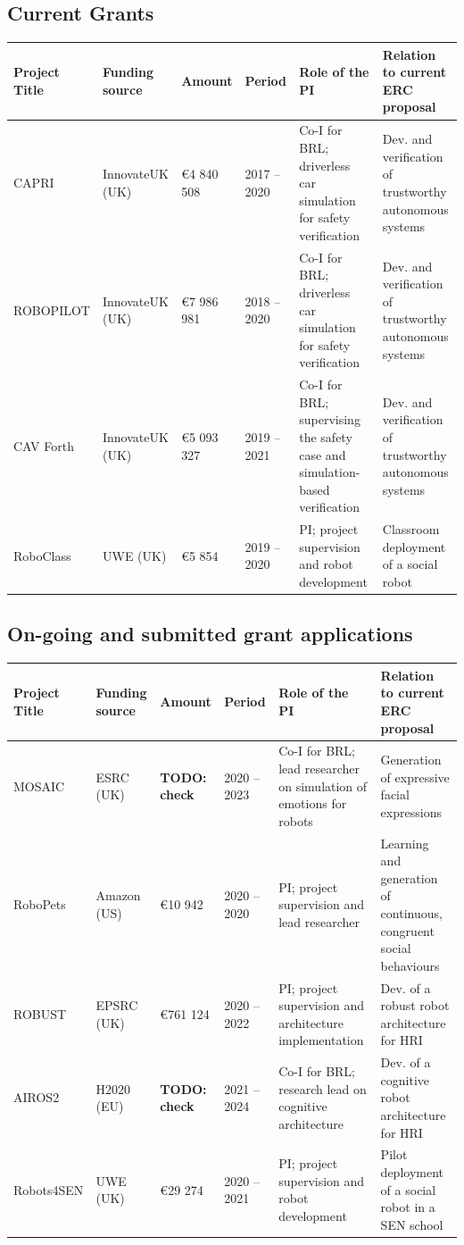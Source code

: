 \documentclass[11pt,a4paper]{report}
\newcommand{\TODO}[1]{{\color{red}\textbf{TODO: #1}}}
\begin{document}
\subsection{Current Grants}

\begin{tabular}{llllp{4cm}p{4cm}}
\toprule
\textbf{Project Title} & \textbf{Funding source} & \textbf{Amount} & \textbf{Period} & \textbf{Role of the PI} & \textbf{Relation to current  ERC proposal} \\ \midrule
    CAPRI & InnovateUK (UK) & €4 840 508 & 2017 -- 2020 & Co-I for BRL; driverless car simulation for safety verification & Dev. and verification of trustworthy autonomous systems \\ \midrule
    ROBOPILOT & InnovateUK (UK) & €7 986 981 & 2018 -- 2020 & Co-I for BRL; driverless car simulation for safety verification & Dev. and verification of trustworthy autonomous systems \\ \midrule
    CAV Forth & InnovateUK (UK) & €5 093 327 & 2019 -- 2021 & Co-I for BRL; supervising the safety case and simulation-based verification & Dev. and verification of trustworthy autonomous systems \\ \midrule
    RoboClass & UWE (UK) & €5 854 & 2019 -- 2020 & PI; project supervision and robot development & Classroom deployment of a social robot \\ \bottomrule
\end{tabular}

\subsection{On-going and submitted grant applications}

\begin{tabular}{llllp{4cm}p{4cm}}
\toprule
\textbf{Project Title} & \textbf{Funding source} & \textbf{Amount} & \textbf{Period} & \textbf{Role of the PI} & \textbf{Relation to current  ERC proposal} \\ \midrule
    MOSAIC & ESRC (UK) & \TODO{check} & 2020 -- 2023 & Co-I for BRL; lead researcher on simulation of emotions for robots & Generation of expressive facial expressions \\ \midrule
    RoboPets & Amazon (US) & €10 942 & 2020 -- 2020 & PI; project supervision and lead researcher & Learning and generation of continuous, congruent social behaviours \\ \midrule
    ROBUST & EPSRC (UK) & €761 124 & 2020 -- 2022 & PI; project supervision and architecture implementation & Dev. of a robust robot architecture for HRI \\ \midrule
    AIROS2 & H2020 (EU) & \TODO{check} & 2021 -- 2024 & Co-I for BRL; research lead on cognitive architecture & Dev. of a cognitive robot architecture for HRI \\ \midrule
    Robots4SEN & UWE (UK) & €29 274 & 2020 -- 2021 & PI; project supervision and robot development & Pilot deployment of a social robot in a SEN school \\ \bottomrule
\end{tabular}
\end{document}
